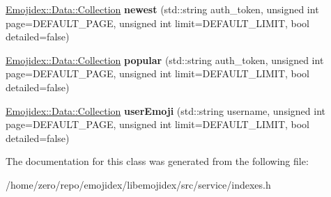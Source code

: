 \begin{DoxyCompactItemize}
\item 
\hyperlink{classEmojidex_1_1Data_1_1Collection}{Emojidex\+::\+Data\+::\+Collection} {\bfseries newest} (std\+::string auth\+\_\+token, unsigned int page=D\+E\+F\+A\+U\+L\+T\+\_\+\+P\+A\+GE, unsigned int limit=D\+E\+F\+A\+U\+L\+T\+\_\+\+L\+I\+M\+IT, bool detailed=false)\hypertarget{classEmojidex_1_1Service_1_1Indexes_aa3033253b1d6fed4ec3046ffbc094ed7}{}\label{classEmojidex_1_1Service_1_1Indexes_aa3033253b1d6fed4ec3046ffbc094ed7}

\item 
\hyperlink{classEmojidex_1_1Data_1_1Collection}{Emojidex\+::\+Data\+::\+Collection} {\bfseries popular} (std\+::string auth\+\_\+token, unsigned int page=D\+E\+F\+A\+U\+L\+T\+\_\+\+P\+A\+GE, unsigned int limit=D\+E\+F\+A\+U\+L\+T\+\_\+\+L\+I\+M\+IT, bool detailed=false)\hypertarget{classEmojidex_1_1Service_1_1Indexes_a15f63f13947e746cbc4e034973183c77}{}\label{classEmojidex_1_1Service_1_1Indexes_a15f63f13947e746cbc4e034973183c77}

\item 
\hyperlink{classEmojidex_1_1Data_1_1Collection}{Emojidex\+::\+Data\+::\+Collection} {\bfseries user\+Emoji} (std\+::string username, unsigned int page=D\+E\+F\+A\+U\+L\+T\+\_\+\+P\+A\+GE, unsigned int limit=D\+E\+F\+A\+U\+L\+T\+\_\+\+L\+I\+M\+IT, bool detailed=false)\hypertarget{classEmojidex_1_1Service_1_1Indexes_ac489e53250311163cea342581ee5730d}{}\label{classEmojidex_1_1Service_1_1Indexes_ac489e53250311163cea342581ee5730d}

\end{DoxyCompactItemize}


The documentation for this class was generated from the following file\+:\begin{DoxyCompactItemize}
\item 
/home/zero/repo/emojidex/libemojidex/src/service/indexes.\+h\end{DoxyCompactItemize}
